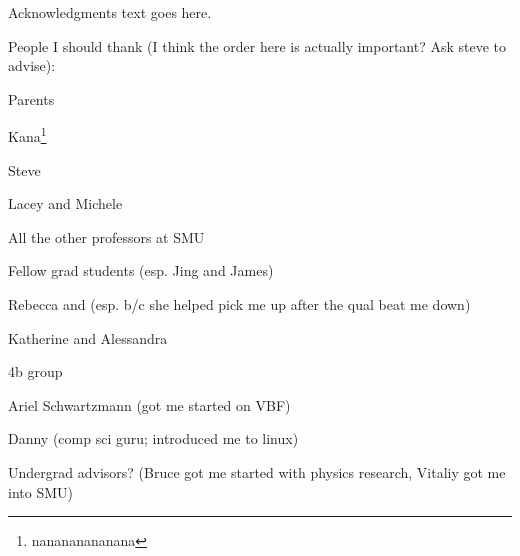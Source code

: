 Acknowledgments text goes here.

People I should thank (I think the order here is actually important? Ask steve to advise):

Parents

Kana\footnote{nanananananana}

Steve

Lacey and Michele

All the other professors at SMU

Fellow grad students (esp. Jing and James)

Rebecca and (esp. b/c she helped pick me up after the qual beat me down)

Katherine and Alessandra

4b group

Ariel Schwartzmann (got me started on VBF)

Danny (comp sci guru; introduced me to linux)

Undergrad advisors? (Bruce got me started with physics research, Vitaliy got me into SMU)

